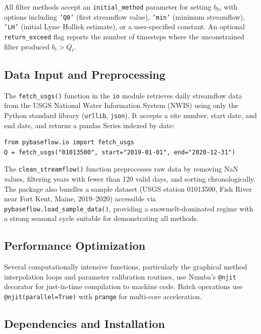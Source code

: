 \documentclass[hydrology,article,submit,pdftex,moreauthors]{Definitions/mdpi}
\begin{document}
All filter methods accept an \texttt{initial\_method} parameter for setting $b_0$, with options including \texttt{'Q0'} (first streamflow value), \texttt{'min'} (minimum streamflow), \texttt{'LH'} (initial Lyne--Hollick estimate), or a user-specified constant. An optional \texttt{return\_exceed} flag reports the number of timesteps where the unconstrained filter produced $b_t > Q_t$.

\subsection{Data Input and Preprocessing}
\label{sec:data_input}

The \texttt{fetch\_usgs()} function in the \texttt{io} module retrieves daily streamflow data from the USGS National Water Information System (NWIS) using only the Python standard library (\texttt{urllib}, \texttt{json}). It accepts a site number, start date, and end date, and returns a pandas Series indexed by date:

\begin{lstlisting}
from pybaseflow.io import fetch_usgs
Q = fetch_usgs("01013500", start="2019-01-01", end="2020-12-31")
\end{lstlisting}

The \texttt{clean\_streamflow()} function preprocesses raw data by removing NaN values, filtering years with fewer than 120 valid days, and sorting chronologically. The package also bundles a sample dataset (USGS station 01013500, Fish River near Fort Kent, Maine, 2019--2020) accessible via \texttt{pybaseflow.load\_sample\_data()}, providing a snowmelt-dominated regime with a strong seasonal cycle suitable for demonstrating all methods.

\subsection{Performance Optimization}
\label{sec:performance}

Several computationally intensive functions, particularly the graphical method interpolation loops and parameter calibration routines, use Numba's \texttt{@njit} decorator for just-in-time compilation to machine code. Batch operations use \texttt{@njit(parallel=True)} with \texttt{prange} for multi-core acceleration.

\subsection{Dependencies and Installation}
\label{sec:dependencies}
\end{document}
